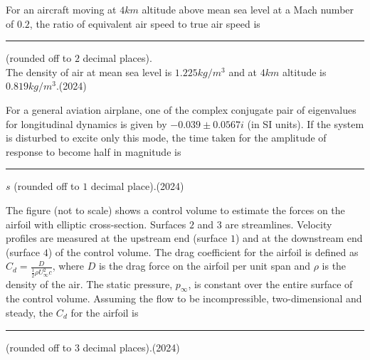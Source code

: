 \item For an aircraft moving at $4km$ altitude above mean sea level at a Mach number of $0.2$, the ratio of equivalent air speed to true air speed is \rule{1cm}{0.15mm} (rounded off to $2$ decimal places).\\

The density of air at mean sea level is $1.225kg/m^{3}$ and at $4km$ altitude is $0.819kg/m^{3}$.\hfill(2024)


\item For a general aviation airplane, one of the complex conjugate pair of eigenvalues for longitudinal dynamics is given by $-0.039\pm 0.0567i$ (in SI units). If the system is disturbed to excite only this mode, the time taken for the amplitude of response to become half in magnitude is \rule{1cm}{0.15mm} $s$ (rounded off to $1$ decimal place).\hfill(2024)


\item The figure (not to scale) shows a control volume to estimate the forces on the airfoil with elliptic cross-section. Surfaces $2$ and $3$ are streamlines. Velocity profiles are measured at the upstream end (surface $1$) and at the downstream end (surface $4$) of the control volume. The drag coefficient for the airfoil is defined as $C_{d}=\frac{D}{\frac{1}{2}\rho U_{\infty}^{2}c}$, where $D$ is the drag force on the airfoil per unit span and $\rho$ is the density of the air. The static pressure, $p_{\infty}$, is constant over the entire surface of the control volume. Assuming the flow to be incompressible, two-dimensional and steady, the $C_{d}$ for the airfoil is \rule{1cm}{0.15mm} (rounded off to $3$ decimal places).\hfill(2024)

